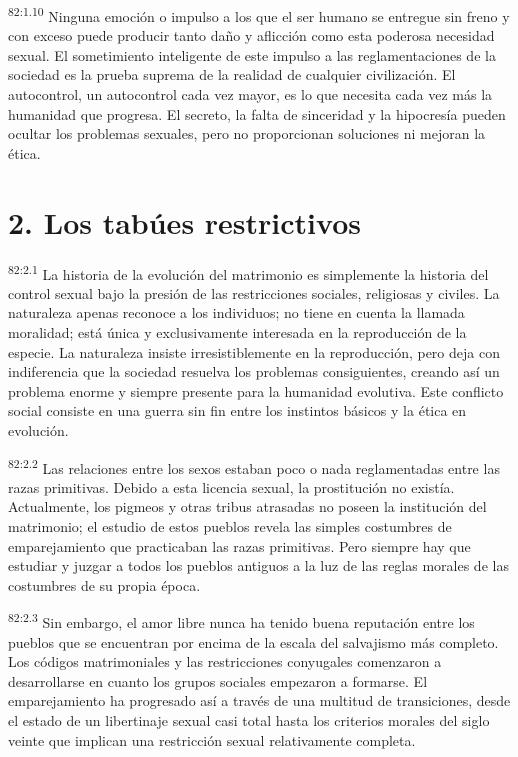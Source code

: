 \documentclass[twoside, 11pt]{book}
\begin{document}
\par
\textsuperscript{82:1.10} Ninguna emoción o impulso a los que el ser humano se entregue sin freno y con exceso puede producir tanto daño y aflicción como esta poderosa necesidad sexual. El sometimiento inteligente de este impulso a las reglamentaciones de la sociedad es la prueba suprema de la realidad de cualquier civilización. El autocontrol, un autocontrol cada vez mayor, es lo que necesita cada vez más la humanidad que progresa. El secreto, la falta de sinceridad y la hipocresía pueden ocultar los problemas sexuales, pero no proporcionan soluciones ni mejoran la ética.

\section*{2. Los tabúes restrictivos}
\par
\textsuperscript{82:2.1} La historia de la evolución del matrimonio es simplemente la historia del control sexual bajo la presión de las restricciones sociales, religiosas y civiles. La naturaleza apenas reconoce a los individuos; no tiene en cuenta la llamada moralidad; está única y exclusivamente interesada en la reproducción de la especie. La naturaleza insiste irresistiblemente en la reproducción, pero deja con indiferencia que la sociedad resuelva los problemas consiguientes, creando así un problema enorme y siempre presente para la humanidad evolutiva. Este conflicto social consiste en una guerra sin fin entre los instintos básicos y la ética en evolución.

\par
\textsuperscript{82:2.2} Las relaciones entre los sexos estaban poco o nada reglamentadas entre las razas primitivas. Debido a esta licencia sexual, la prostitución no existía. Actualmente, los pigmeos y otras tribus atrasadas no poseen la institución del matrimonio; el estudio de estos pueblos revela las simples costumbres de emparejamiento que practicaban las razas primitivas. Pero siempre hay que estudiar y juzgar a todos los pueblos antiguos a la luz de las reglas morales de las costumbres de su propia época.

\par
\textsuperscript{82:2.3} Sin embargo, el amor libre nunca ha tenido buena reputación entre los pueblos que se encuentran por encima de la escala del salvajismo más completo. Los códigos matrimoniales y las restricciones conyugales comenzaron a desarrollarse en cuanto los grupos sociales empezaron a formarse. El emparejamiento ha progresado así a través de una multitud de transiciones, desde el estado de un libertinaje sexual casi total hasta los criterios morales del siglo veinte que implican una restricción sexual relativamente completa.
\end{document}
